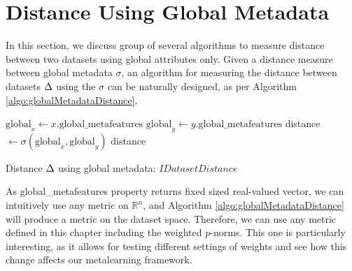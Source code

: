 \section{Distance Using Global Metadata}
\label{section:distanceUsingGlobalMetadata}
In this section, we discuss group of several algorithms to measure distance between two datasets using global attributes only. Given a distance measure between global metadata $\sigma$, an algorithm for measuring the distance between datasets $\Delta$ using the $\sigma$ can be naturally designed, as per Algorithm \ref{algo:globalMetadataDistance}.

\IncMargin{1em}
\begin{algorithm}
	\BlankLine
	$\text{global}_x \leftarrow x.\text{global\_metafeatures}$\;
	$\text{global}_y \leftarrow y.\text{global\_metafeatures}$\;
	distance $\leftarrow \sigma(\text{global}_x,\text{global}_y)$\;
	\Return distance\;
	\caption{Distance $\Delta$ using global metadata: $IDatasetDistance$}
	\label{algo:globalMetadataDistance}
\end{algorithm}\DecMargin{1em}

As global\_metafeatures property returns fixed sized real-valued vector, we can intuitively use any metric on $\mathbb{R}^n$, and Algorithm \ref{algo:globalMetadataDistance} will produce a metric on the dataset space. Therefore, we can use any metric defined in this chapter including the weighted $p$-norms. This one is particularly interesting, as it allows for testing different settings of weights and see how this change affects our metalearning framework.